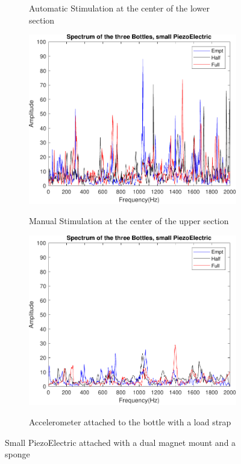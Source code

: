 \begin{figure}[]
\begin{subfigure}{0.45\textwidth}
        \caption{Automatic Stimulation at the center of the lower section}{}
        \label{subfig:ResPiezzAuBot}
    \end{subfigure}
    \begin{subfigure}{0.45\textwidth}
        \centering
        \includegraphics[width=\linewidth]{Chapters/6CHP/Figures/ResultsSensors/PiezzMaTop.pdf}
        \caption{Manual Stimulation at the center of the upper section}{}
        \label{subfig:ResPiezzMaTop}
    \end{subfigure}
    \begin{subfigure}{0.45\textwidth}
        \centering
        \includegraphics[width=\linewidth]{Chapters/6CHP/Figures/ResultsSensors/PiezzAuTop.pdf}
        \caption{Accelerometer attached to the bottle with a load strap}{}
        \label{subfig:ResPiezzAuTop}
    \end{subfigure}
    \caption{Small PiezoElectric attached with a dual magnet mount and a sponge}{}
    \label{fig:Piezz}
\end{figure}
